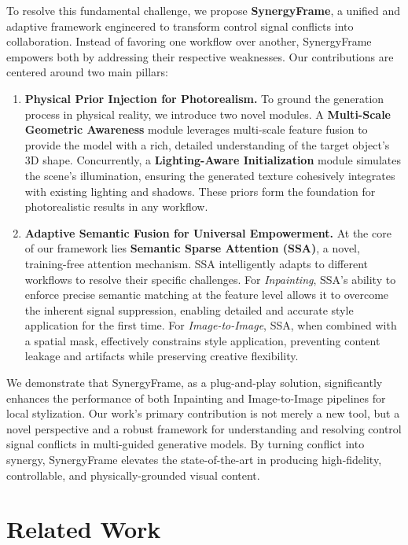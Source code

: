 \documentclass[letterpaper]{article} %
\begin{document}
To resolve this fundamental challenge, we propose \textbf{SynergyFrame}, a unified and adaptive framework engineered to transform control signal conflicts into collaboration. Instead of favoring one workflow over another, SynergyFrame empowers both by addressing their respective weaknesses. Our contributions are centered around two main pillars:

\begin{enumerate}
    \item \textbf{Physical Prior Injection for Photorealism.} To ground the generation process in physical reality, we introduce two novel modules. A \textbf{Multi-Scale Geometric Awareness} module leverages multi-scale feature fusion to provide the model with a rich, detailed understanding of the target object's 3D shape. Concurrently, a \textbf{Lighting-Aware Initialization} module simulates the scene's illumination, ensuring the generated texture cohesively integrates with existing lighting and shadows. These priors form the foundation for photorealistic results in any workflow.

    \item \textbf{Adaptive Semantic Fusion for Universal Empowerment.} At the core of our framework lies \textbf{Semantic Sparse Attention (SSA)}, a novel, training-free attention mechanism. SSA intelligently adapts to different workflows to resolve their specific challenges. For \textit{Inpainting}, SSA's ability to enforce precise semantic matching at the feature level allows it to overcome the inherent signal suppression, enabling detailed and accurate style application for the first time. For \textit{Image-to-Image}, SSA, when combined with a spatial mask, effectively constrains style application, preventing content leakage and artifacts while preserving creative flexibility.
\end{enumerate}

We demonstrate that SynergyFrame, as a plug-and-play solution, significantly enhances the performance of both Inpainting and Image-to-Image pipelines for local stylization. Our work's primary contribution is not merely a new tool, but a novel perspective and a robust framework for understanding and resolving control signal conflicts in multi-guided generative models. By turning conflict into synergy, SynergyFrame elevates the state-of-the-art in producing high-fidelity, controllable, and physically-grounded visual content.

\section{Related Work}
\label{sec:related_work}
\end{document}
